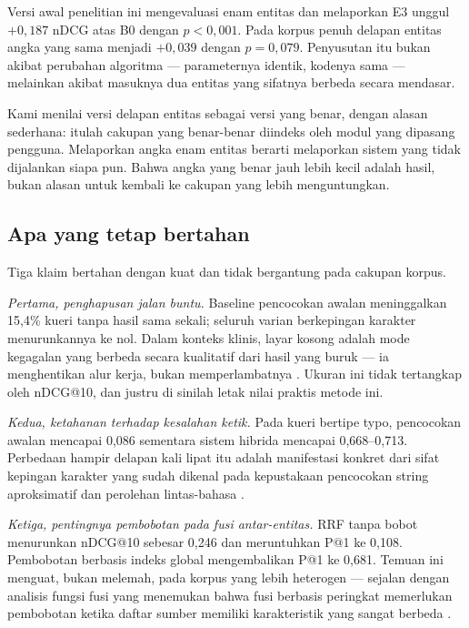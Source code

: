 \documentclass[journal,twoside,web]{ieeecolor}
\begin{document}
Versi awal penelitian ini mengevaluasi enam entitas dan melaporkan E3 unggul
$+0{,}187$ nDCG atas B0 dengan $p < 0{,}001$. Pada korpus penuh delapan entitas
angka yang sama menjadi $+0{,}039$ dengan $p = 0{,}079$. Penyusutan itu bukan
akibat perubahan algoritma --- parameternya identik, kodenya sama --- melainkan
akibat masuknya dua entitas yang sifatnya berbeda secara mendasar.

Kami menilai versi delapan entitas sebagai versi yang benar, dengan alasan
sederhana: itulah cakupan yang benar-benar diindeks oleh modul yang dipasang
pengguna. Melaporkan angka enam entitas berarti melaporkan sistem yang tidak
dijalankan siapa pun. Bahwa angka yang benar jauh lebih kecil adalah hasil, bukan
alasan untuk kembali ke cakupan yang lebih menguntungkan.

\subsection{Apa yang tetap bertahan}

Tiga klaim bertahan dengan kuat dan tidak bergantung pada cakupan korpus.

\emph{Pertama, penghapusan jalan buntu.} Baseline pencocokan awalan meninggalkan
15,4\% kueri tanpa hasil sama sekali; seluruh varian berkepingan karakter
menurunkannya ke nol. Dalam konteks klinis, layar kosong adalah mode kegagalan
yang berbeda secara kualitatif dari hasil yang buruk --- ia menghentikan alur
kerja, bukan memperlambatnya \cite{hersh2020, natarajan2010}. Ukuran ini tidak
tertangkap oleh nDCG@10, dan justru di sinilah letak nilai praktis metode ini.

\emph{Kedua, ketahanan terhadap kesalahan ketik.} Pada kueri bertipe typo,
pencocokan awalan mencapai 0,086 sementara sistem hibrida mencapai 0,668--0,713.
Perbedaan hampir delapan kali lipat itu adalah manifestasi konkret dari sifat
kepingan karakter yang sudah dikenal pada kepustakaan pencocokan string
aproksimatif \cite{ukkonen1992, kondrak2005} dan perolehan lintas-bahasa
\cite{mcnamee2004}.

\emph{Ketiga, pentingnya pembobotan pada fusi antar-entitas.} RRF tanpa bobot
menurunkan nDCG@10 sebesar 0,246 dan meruntuhkan P@1 ke 0,108. Pembobotan
berbasis indeks global mengembalikan P@1 ke 0,681. Temuan ini menguat, bukan
melemah, pada korpus yang lebih heterogen --- sejalan dengan analisis fungsi fusi
yang menemukan bahwa fusi berbasis peringkat memerlukan pembobotan ketika daftar
sumber memiliki karakteristik yang sangat berbeda \cite{bruch2023, cormack2009}.
\end{document}
